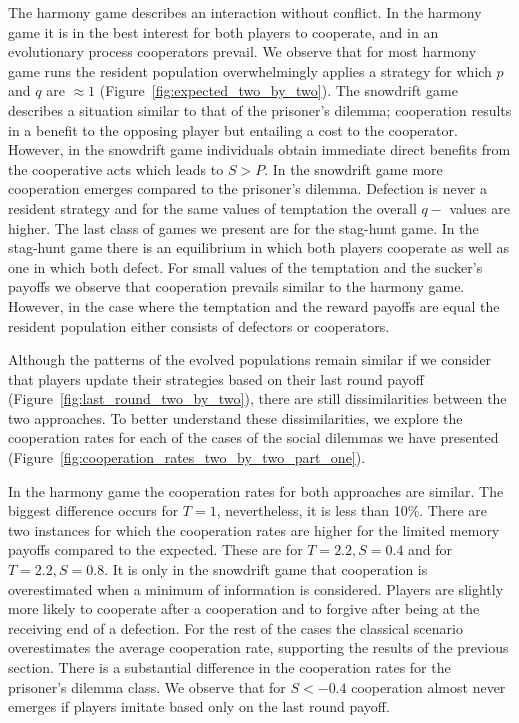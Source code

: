 \documentclass[11pt]{article}
\theoremstyle{plainCl1}
\theoremstyle{plainCl2}
\begin{document}
The harmony game describes an interaction without conflict. In the harmony game
it is in the best interest for both players to cooperate, and in an evolutionary
process cooperators prevail. We observe that for most harmony game runs the
resident population overwhelmingly applies a strategy for which \(p\) and \(q\)
are \(\approx 1\) (Figure~\ref{fig:expected_two_by_two}). The snowdrift game
describes a situation similar to that of the prisoner's dilemma; cooperation
results in a benefit to the opposing player but entailing a cost to the
cooperator. However, in the snowdrift game individuals obtain immediate direct
benefits from the cooperative acts which leads to \(S > P\). In the snowdrift
game more cooperation emerges compared to the prisoner's dilemma. Defection is
never a resident strategy and for the same values of temptation the overall
\(q-\) values are higher. The last class of games we present are for the stag-hunt
game. In the stag-hunt game there is an equilibrium in which both players
cooperate as well as one in which both defect. For small values of the
temptation and the sucker's payoffs we observe that cooperation prevails similar
to the harmony game. However, in the case where the temptation and the reward
payoffs are equal the resident population either consists of defectors or
cooperators.

Although the patterns of the evolved populations remain similar if we consider
that players update their strategies based on their last round payoff
(Figure~\ref{fig:last_round_two_by_two}), there are still dissimilarities
between the two approaches. To better understand these dissimilarities, we
explore the cooperation rates for each of the cases of the social dilemmas we
have presented (Figure~\ref{fig:cooperation_rates_two_by_two_part_one}).

In the harmony game the cooperation rates for both approaches are similar. The
biggest difference occurs for \(T=1\), nevertheless, it is less than 10\%. There
are two instances for which the cooperation rates are higher for the limited
memory payoffs compared to the expected. These are for \(T=2.2, S=0.4\) and for
\(T=2.2, S=0.8\). It is only in the snowdrift game that cooperation is
overestimated when a minimum of information is considered. Players are slightly
more likely to cooperate after a cooperation and to forgive after being at the
receiving end of a defection. For the rest of the cases the classical scenario
overestimates the average cooperation rate, supporting the results of the
previous section. There is a substantial difference in the cooperation rates
for the prisoner's dilemma class. We observe that for \(S<-0.4\) cooperation
almost never emerges if players imitate based only on the last round payoff.
\end{document}
